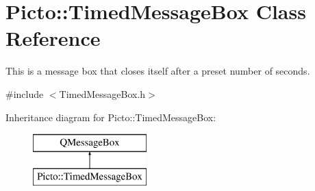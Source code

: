 \hypertarget{class_picto_1_1_timed_message_box}{\section{Picto\-:\-:Timed\-Message\-Box Class Reference}
\label{class_picto_1_1_timed_message_box}
}


This is a message box that closes itself after a preset number of seconds.  




{\ttfamily \#include $<$Timed\-Message\-Box.\-h$>$}

Inheritance diagram for Picto\-:\-:Timed\-Message\-Box\-:\begin{figure}[H]
\begin{center}
\leavevmode
\includegraphics[height=2.000000cm]{class_picto_1_1_timed_message_box}
\end{center}
\end{figure}

